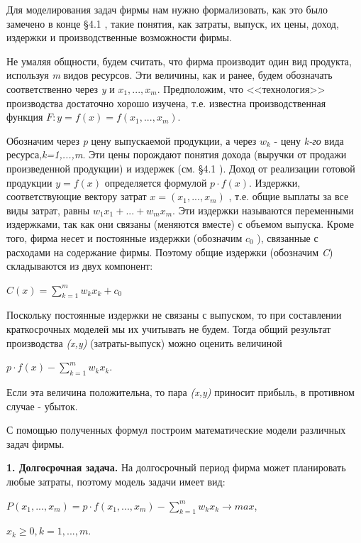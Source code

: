 \documentclass[12pt, 4paper]{book}
\begin{document}
{Для моделирования задач фирмы нам нужно формализовать, как это было замечено в конце §4.1 , такие понятия, как затраты, выпуск, их цены, доход, издержки и производственные возможности фирмы. 
\par

Не умаляя общности, будем считать, что фирма производит один вид продукта, используя \textit{m} видов ресурсов. Эти величины, как и ранее, будем обозначать соответственно через \textit{y} и $x_1,...,x_m$. Предположим, что <<технология>> производства достаточно хорошо изучена, т.е. известна производственная функция $F:y=f(x)=f(x_1,...,x_m)$. 
\par

Обозначим через \textit{p} цену выпускаемой продукции, а через $w_k$ - цену \textit{k-го} вида ресурса,\textit{k=1,...,m}. Эти цены порождают понятия дохода (выручки от продажи произведенной продукции) и издержек (см. §4.1 ). Доход от реализации готовой продукции $y=f(x)$ определяется формулой $p \cdot f(x)$. Издержки, соответствующие вектору затрат $x=(x_1,...,x_m)$ , т.е. общие выплаты за все виды затрат, равны $w_1 x_1 + ... + w_m x_m$. Эти издержки называются переменными издержками, так как они связаны (меняются вместе) с объемом выпуска. Кроме того, фирма несет и постоянные издержки (обозначим $c_0$ ), связанные с расходами на содержание фирмы. Поэтому общие издержки (обозначим \textit{C}) складываются из двух компонент: 
\begin{center}
$C(x)=\sum\limits_{k=1}^{m}w_k x_k + c_0$
\end{center}
\par

Поскольку постоянные издержки не связаны с выпуском, то при составлении краткосрочных моделей мы их учитывать не будем. Тогда общий результат производства \textit{(x,y)} (затраты-выпуск) можно оценить величиной 
\begin{center}
$p \cdot f(x) - \sum\limits_{k=1}^{m}w_k x_k$.
\end{center}
\par

Если эта величина положительна, то пара \textit{(x,y)} приносит прибыль, в противном случае - убыток. 
\par

С помощью полученных формул построим математические модели различных задач фирмы. 
\par

\textbf{1.	Долгосрочная задача.} На долгосрочный период фирма может планировать любые затраты, поэтому модель задачи имеет вид: 
\begin{center}
$P(x_1,...,x_m)=p \cdot f(x_1,...,x_m) - \sum\limits_{k=1}^{m}w_k x_k \rightarrow max$,
\end{center}
\begin{center}
$x_k \geq 0, k=1,...,m$.
\end{center}
\par

}
\end{document}
